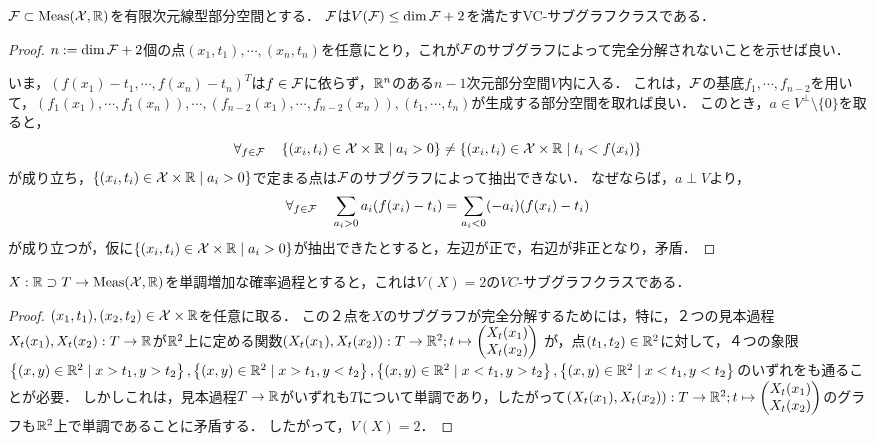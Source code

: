 \documentclass[uplatex,dvipdfmx]{jsreport}
\begin{document}
\begin{example}[線型空間との関係]
    $\mathcal{F}\subset\mathrm{Meas}(\mathcal{X},\mathbb{R})$を有限次元線型部分空間とする．
    $\mathcal{F}$は$V(\mathcal{F})\le\dim\mathcal{F}+2$を満たすVC-サブグラフクラスである．
\end{example}
\begin{proof}
    $n:=\dim\mathcal{F}+2$個の点$(x_1,t_1),\cdots,(x_n,t_n)$を任意にとり，これが$\mathcal{F}$のサブグラフによって完全分解されないことを示せば良い．

    いま，$(f(x_1)-t_1,\cdots,f(x_n)-t_n)^T$は$f\in\mathcal{F}$に依らず，$\mathbb{R}^n$のある$n-1$次元部分空間$V$内に入る．
    これは，$\mathcal{F}$の基底$f_1,\cdots,f_{n-2}$を用いて，$(f_1(x_1),\cdots,f_1(x_n)),\cdots,(f_{n-2}(x_1),\cdots,f_{n-2}(x_n)),(t_1,\cdots,t_n)$が生成する部分空間を取れば良い．
    このとき，$a\in V^\perp\setminus\{0\}$を取ると，
    \[\forall_{f\in\mathcal{F}}\quad\left\{(x_i,t_i)\in\mathcal{X}\times\mathbb{R}\mid a_i>0\right\}\ne\left\{(x_i,t_i)\in\mathcal{X}\times\mathbb{R}\mid t_i<f(x_i)\right\}\]
    が成り立ち，$\left\{(x_i,t_i)\in\mathcal{X}\times\mathbb{R}\mid a_i>0\right\}$で定まる点は$\mathcal{F}$のサブグラフによって抽出できない．
    なぜならば，$a\perp V$より，
    \[\forall_{f\in\mathcal{F}}\quad\sum_{a_i>0}a_i(f(x_i)-t_i)=\sum_{a_i<0}(-a_i)(f(x_i)-t_i)\]
    が成り立つが，仮に$\left\{(x_i,t_i)\in\mathcal{X}\times\mathbb{R}\mid a_i>0\right\}$が抽出できたとすると，左辺が正で，右辺が非正となり，矛盾．
\end{proof}

\begin{example}
    $X:\mathbb{R}\supset T\to\mathrm{Meas}(\mathcal{X},\mathbb{R})$を単調増加な確率過程とすると，これは$V(X)=2$の$VC$-サブグラフクラスである．
\end{example}
\begin{proof}
    $(x_1,t_1),(x_2,t_2)\in\mathcal{X}\times\mathbb{R}$を任意に取る．
    この２点を$X$のサブグラフが完全分解するためには，特に，２つの見本過程$X_t(x_1),X_t(x_2):T\to\mathbb{R}$が$\mathbb{R}^2$上に定める関数$(X_t(x_1),X_t(x_2)):T\to\mathbb{R}^2;t\mapsto \begin{pmatrix}X_t(x_1)\\X_t(x_2)\end{pmatrix}$
    が，点$(t_1,t_2)\in\mathbb{R}^2$に対して，４つの象限$\left\{(x,y)\in\mathbb{R}^2\mid x>t_1,y>t_2\right\},\left\{(x,y)\in\mathbb{R}^2\mid x>t_1,y<t_2\right\},\left\{(x,y)\in\mathbb{R}^2\mid x<t_1,y>t_2\right\},\left\{(x,y)\in\mathbb{R}^2\mid x<t_1,y<t_2\right\}$のいずれをも通ることが必要．
    しかしこれは，見本過程$T\to\mathbb{R}$がいずれも$T$について単調であり，したがって$(X_t(x_1),X_t(x_2)):T\to\mathbb{R}^2;t\mapsto \begin{pmatrix}X_t(x_1)\\X_t(x_2)\end{pmatrix}$のグラフも$\mathbb{R}^2$上で単調であることに矛盾する．
    したがって，$V(X)=2$．
\end{proof}
\end{document}
